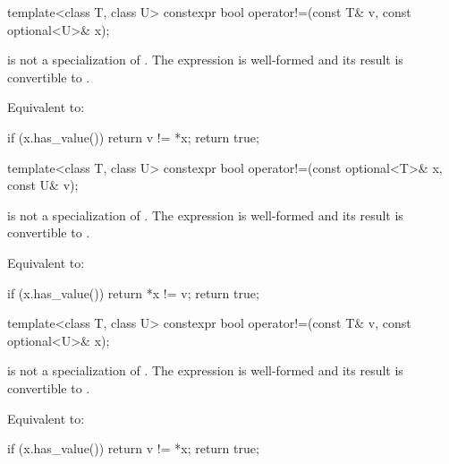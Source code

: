 \begin{removedblock}
%
\begin{itemdecl}
template<class T, class U> constexpr bool operator!=(const T& v, const optional<U>& x);
\end{itemdecl}

\begin{itemdescr}
\pnum
\constraints
{} is not a specialization of . The expression  is well-formed and its result is convertible to .

\pnum
\effects
Equivalent to:
\begin{codeblock}
if (x.has_value())
  return v != *x;
return true;
\end{codeblock}
\end{itemdescr}
\end{removedblock}

\begin{addedblock}
%
\begin{itemdecl}
template<class T, class U>
  constexpr bool operator!=(const optional<T>& x, const U& v);
\end{itemdecl}

\begin{itemdescr}
\pnum
\constraints
{} is not a specialization of . The expression  is well-formed and its result is convertible to .

\pnum
\effects
Equivalent to:
\begin{codeblock}
if (x.has_value())
  return *x != v;
return true;
\end{codeblock}
\end{itemdescr}
\end{addedblock}

\begin{addedblock}
%
\begin{itemdecl}
template<class T, class U>
  constexpr bool operator!=(const T& v, const optional<U>& x);
\end{itemdecl}

\begin{itemdescr}
\pnum
\constraints
{} is not a specialization of . The expression  is well-formed and its result is convertible to .

\pnum
\effects
Equivalent to:
\begin{codeblock}
if (x.has_value())
  return v != *x;
return true;
\end{codeblock}
\end{itemdescr}
\end{addedblock}

